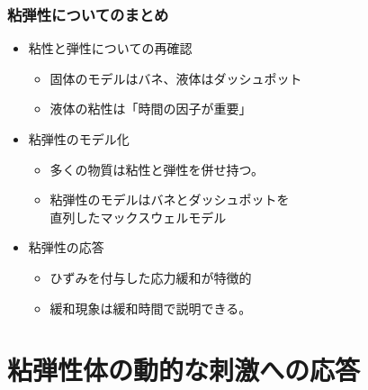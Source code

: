 \documentclass[12pt, dvipdfmx]{beamer}
\begin{document}
\begin{frame}
	\frametitle{粘弾性についてのまとめ}
        \begin{boxnote}
            \vspace{-3mm}
            \begin{itemize}
                \item 粘性と弾性についての再確認
                    \begin{itemize}
                        \item 固体のモデルはバネ、液体はダッシュポット
                        \item 液体の粘性は「時間の因子が重要」
                    \end{itemize} 
                \item 粘弾性のモデル化
                    \begin{itemize}
                        \item 多くの物質は粘性と弾性を併せ持つ。
                        \item 粘弾性のモデルはバネとダッシュポットを\\直列したマックスウェルモデル
                    \end{itemize} 
                \item 粘弾性の応答
                    \begin{itemize}
                        \item ひずみを付与した応力緩和が特徴的
                        \item 緩和現象は緩和時間で説明できる。
                    \end{itemize}
            \end{itemize}
        \end{boxnote}
\end{frame}

\section{粘弾性体の動的な刺激への応答}
\end{document}
